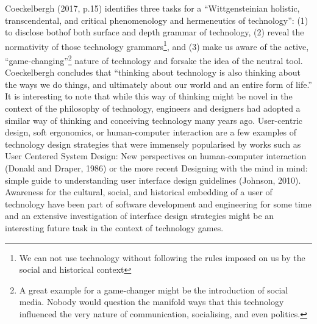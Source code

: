 Coeckelbergh (2017, p.15) identifies three tasks for a “Wittgensteinian holistic, transcendental, and critical phenomenology and hermeneutics of
technology”: (1) to disclose bothof both surface and depth grammar of technology, (2) reveal the normativity of those technology
grammars\footnote{We can not use technology without following the rules imposed on us by the social and historical context}, and (3) make us
aware of the active, “game-changing”\footnote{A great example for a game-changer might be the introduction of social media. Nobody
would question the manifold ways that this technology influenced the very nature of communication, socialising, and even politics.} nature
of technology and forsake the idea of the neutral tool. Coeckelbergh concludes that “thinking about technology is also thinking about the
ways we do things, and ultimately about our world and an entire form of life.” It is interesting to note that while this way of thinking might
be novel in the context of the philosophy of technology, engineers and designers had adopted a similar way of thinking and conceiving
technology many years ago. User-centric design, soft ergonomics, or human-computer interaction are a few examples of technology design
strategies that were immensely popularised by works such as User Centered System Design: New perspectives on human-computer interaction
(Donald and Draper, 1986) or the more recent Designing with the mind in mind: simple guide to understanding user interface design
guidelines (Johnson, 2010). Awareness for the cultural, social, and historical embedding of a user of technology have been part of software
development and engineering for some time and an extensive investigation of interface design strategies might be an interesting future task in
the context of technology games.